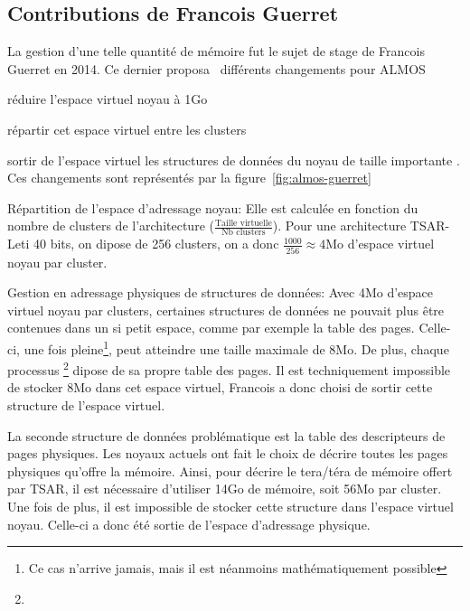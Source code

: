       
    \subsection{Contributions de Francois Guerret}
      
      La gestion d'une telle quantité de mémoire fut le sujet de stage de
      Francois Guerret en 2014. Ce dernier
      proposa~\cite{guerret2014exploitation} différents changements pour ALMOS
      \benumline \item réduire l'espace virtuel noyau à 1Go \item répartir cet
      espace virtuel entre les clusters \item sortir de l'espace virtuel les
      structures de données du noyau de taille importante \eenumline. Ces
      changements sont représentés par la figure~\ref{fig:almos-guerret}

      \begin{paragraph}{Répartition de l'espace d'adressage noyau:}
        Elle est calculée en fonction du nombre de clusters de l'architecture
        ($\frac{\text{Taille virtuelle}}{\text{Nb clusters}}$). Pour une
        architecture TSAR-Leti 40 bits, on dipose de 256 clusters, on a donc
        $\frac{1000}{256}\approx4$Mo d'espace virtuel noyau par cluster.
      \end{paragraph}
      \begin{paragraph}{Gestion en adressage physiques de structures de données:}
        Avec 4Mo d'espace virtuel noyau par clusters, certaines structures de
        données ne pouvait plus être contenues dans un si petit espace, comme
        par exemple la table des pages. Celle-ci, une fois pleine\footnote{Ce
          cas n'arrive jamais, mais il est néanmoins mathématiquement possible},
        peut atteindre une taille maximale de 8Mo. De plus, chaque
        processus \footnote{}  dipose de sa
        propre table des pages. Il est techniquement impossible de stocker 8Mo
        dans cet espace virtuel, Francois a donc choisi de sortir cette
        structure de l'espace virtuel.

        La seconde structure de données problématique est la table des
        descripteurs de pages physiques. Les noyaux actuels ont fait le choix de
        décrire toutes les pages physiques qu'offre la mémoire. Ainsi, pour
        décrire le tera/téra de mémoire offert par TSAR, il est nécessaire
        d'utiliser 14Go de mémoire, soit 56Mo par cluster. Une fois de plus, il
        est impossible de stocker cette structure dans l'espace virtuel
        noyau. Celle-ci a donc été sortie de l'espace d'adressage physique.
      \end{paragraph}

